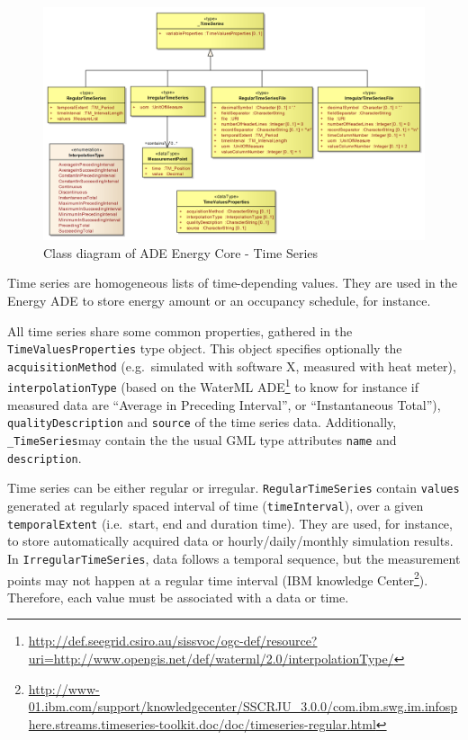 \documentclass[a4paper,12pt]{article}
\renewcommand{\href}[2]{#2\footnote{\url{#1}}}
\begin{document}
\begin{figure}[htbp]
\centering
\includegraphics{fig/class_time.png}
\caption{Class diagram of ADE Energy Core - Time Series}
\end{figure}

Time series are homogeneous lists of time-depending values. They are
used in the Energy ADE to store energy amount or an occupancy schedule,
for instance.

All time series share some common properties, gathered in the
\lstinline!TimeValuesProperties! type object. This object specifies
optionally the \lstinline!acquisitionMethod! (e.g.~simulated with
software X, measured with heat meter), \lstinline!interpolationType!
(based on the
\href{http://def.seegrid.csiro.au/sissvoc/ogc-def/resource?uri=http://www.opengis.net/def/waterml/2.0/interpolationType/}{WaterML
ADE} to know for instance if measured data are ``Average in Preceding
Interval'', or ``Instantaneous Total''), \lstinline!qualityDescription!
and \lstinline!source! of the time series data. Additionally,
\lstinline!_TimeSeries!may contain the the usual GML type attributes
\lstinline!name! and \lstinline!description!.

Time series can be either regular or irregular.
\lstinline!RegularTimeSeries! contain \lstinline!values! generated at
regularly spaced interval of time (\lstinline!timeInterval!), over a
given \lstinline!temporalExtent! (i.e.~start, end and duration time).
They are used, for instance, to store automatically acquired data or
hourly/daily/monthly simulation results. In
\lstinline!IrregularTimeSeries!, data follows a temporal sequence, but
the measurement points may not happen at a regular time interval
(\href{http://www-01.ibm.com/support/knowledgecenter/SSCRJU_3.0.0/com.ibm.swg.im.infosphere.streams.timeseries-toolkit.doc/doc/timeseries-regular.html}{IBM
knowledge Center}). Therefore, each value must be associated with a data
or time.
\end{document}
